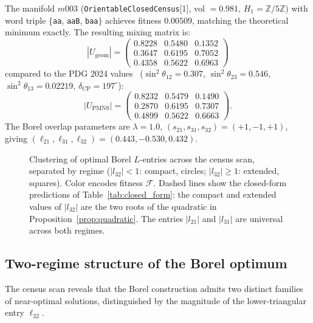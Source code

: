 \documentclass[11pt,a4paper]{article}
\newcommand{\Zfive}{\mathbb{Z}/5\mathbb{Z}}
\begin{document}
The manifold $m003$ (\texttt{OrientableClosedCensus}[1],
vol $= 0.981$, $H_1 = \Zfive$) with word triple
$\{$\texttt{aa}, \texttt{aaB}, \texttt{baa}$\}$ achieves fitness $0.00509$,
matching the theoretical minimum exactly. The resulting mixing matrix is:
\begin{equation}
|U_\mathrm{geom}| = \begin{pmatrix}
  0.8228 & 0.5480 & 0.1352 \\
  0.3647 & 0.6195 & 0.7052 \\
  0.4358 & 0.5622 & 0.6963
\end{pmatrix}
\label{eq:U_pmns_result}
\end{equation}
compared to the PDG 2024 values~\cite{PDG2024} ($\sin^2\theta_{12}=0.307$, $\sin^2\theta_{23}=0.546$, $\sin^2\theta_{13}=0.02219$, $\delta_\mathrm{CP}=197^\circ$):
\begin{equation}
|U_\mathrm{PMNS}| = \begin{pmatrix}
  0.8232 & 0.5479 & 0.1490 \\
  0.2870 & 0.6195 & 0.7307 \\
  0.4899 & 0.5622 & 0.6663
\end{pmatrix}.
\label{eq:U_pmns_pdg}
\end{equation}
The Borel overlap parameters are $\lambda = 1.0$,
$(s_{21}, s_{31}, s_{32}) = (+1, -1, +1)$, giving
$(\ell_{21}, \ell_{31}, \ell_{32}) = (0.443, -0.530, 0.432)$.


\begin{figure}[!t]
\centering
\caption{Clustering of optimal Borel $L$-entries across the census scan,
separated by regime ($|l_{32}| < 1$: compact, circles; $|l_{32}| \geq 1$:
extended, squares). Color encodes fitness $\mathcal{F}$.
Dashed lines show the closed-form predictions of
Table~\ref{tab:closed_form}: the compact and extended values of $|l_{32}|$
are the two roots of the quadratic in Proposition~\ref{prop:quadratic}.
The entries $|l_{21}|$ and $|l_{31}|$ are universal across both regimes.}
\label{fig:clustering}
\end{figure}




\subsection{Two-regime structure of the Borel optimum}
\label{sec:tworegimes}
 
The census scan reveals that the Borel construction admits two
distinct families of near-optimal solutions, distinguished by the
magnitude of the lower-triangular entry $\ell_{32}$.
 
\end{document}
